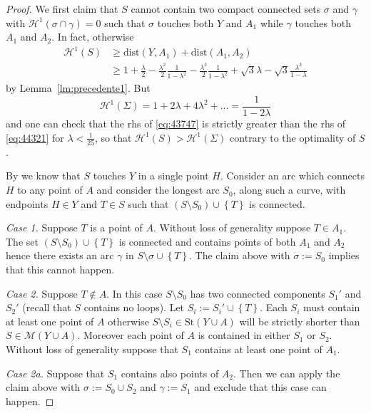 \documentclass{article}
\renewcommand{\H}{\mathcal H}
\newcommand{\ENCLOSE}[1]{\left\{#1\right\}}
\newcommand{\St}{\mathrm{St}}
\newcommand{\M}{\mathcal{M}}
\renewcommand{\H}{\mathcal{H}}
\newcommand{\dist}{\mathrm{dist}}
\theoremstyle{definition}
\theoremstyle{remark}
\begin{document}
\begin{proof}
We first claim that $S$ cannot contain 
two compact connected sets 
$\sigma$ and $\gamma$
with $\H^1(\sigma\cap \gamma)=0$
such that $\sigma$ touches both $Y$ and $A_1$ 
while $\gamma$ touches both $A_1$ and $A_2$.
In fact, otherwise
\begin{equation}
\label{eq:43747}
\begin{aligned}
  \H^1(S)
  &\ge \dist(Y, A_1) + \dist(A_1, A_2)
  \\
  &\ge 
  1+ \frac{\lambda} 2 
    - \frac{\lambda^2}{2}\frac{1}{1-\lambda^2}
    - \frac{\lambda^3}{2}\frac{1}{1-\lambda^2} 
   +
   \sqrt 3 \lambda - \sqrt 3 \frac{\lambda^3}{1-\lambda}
\end{aligned}
\end{equation}
by Lemma~\ref{lm:precedente1}.
But 
\begin{equation}\label{eq:44321}
  \H^1(\Sigma) 
  = 1 + 2 \lambda + 4 \lambda^2 + \dots 
  = \frac{1}{1-2\lambda}
\end{equation}
and one can check that the rhs of \eqref{eq:43747} is
strictly greater than the rhs of \eqref{eq:44321}
for $\lambda < \frac 1 {25}$,
so that $\H^1(S) > \H^1(\Sigma)$ contrary 
to the optimality of $S$.

By \cite{PaoSte} we know that $S$ touches $Y$ in a single point $H$.
Consider an arc which connects $H$ to any point of $A$ 
and consider the longest arc $S_0$, along such a curve, 
with endpoints $H\in Y$ and $T\in S$
such that $(S\setminus S_0) \cup \ENCLOSE{T}$ is connected.

\emph{Case 1.} Suppose $T$ is a point of $A$. 
Without loss of generality suppose $T\in A_1$.
The set $(S\setminus S_0)\cup\ENCLOSE{T}$ 
is connected and contains points of both $A_1$ 
and $A_2$ hence there exists an arc $\gamma$ in $S\setminus \sigma\cup\ENCLOSE{T}$.
The claim above with $\sigma:=S_0$ implies that this cannot happen.

\emph{Case 2.} Suppose $T\not \in A$.
In this case $S\setminus S_0$ has two connected components 
$S_1'$ and $S_2'$ (recall that $S$ contains no loops). 
Let $S_i:=S_i'\cup \ENCLOSE{T}$.
Each $S_i$ must contain at least one point of $A$ otherwise 
$S\setminus S_i\in \St(Y\cup A)$ will be 
strictly shorter than $S\in \M(Y\cup A)$.
Moreover each point of $A$ is contained in either $S_1$ or $S_2$.
Without loss of generality suppose that $S_1$ 
contains at least one point of $A_1$.

\emph{Case 2a.} Suppose that $S_1$ contains also points of $A_2$.
Then we can apply the claim above with 
$\sigma:= S_0 \cup S_2$ and 
$\gamma:= S_1$ and exclude that this case can happen.


\end{proof}
\end{document}
